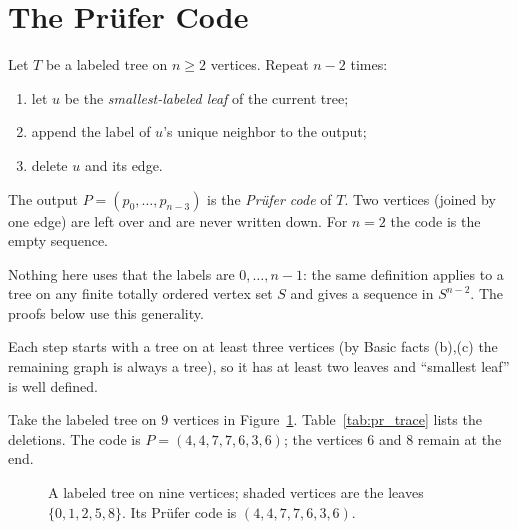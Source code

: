 \documentclass[11pt]{article}
\begin{document}
\section{The Prüfer Code}
\begin{definitionbox}
Let $T$ be a labeled tree on $n\ge 2$ vertices. Repeat $n-2$ times:
\begin{enumerate}[leftmargin=1.5em,itemsep=1pt]
  \item let $u$ be the \emph{smallest-labeled leaf} of the current tree;
  \item append the label of $u$'s unique neighbor to the output;
  \item delete $u$ and its edge.
\end{enumerate}
The output $P=(p_0,\dots,p_{n-3})$ is the \emph{Prüfer code} of $T$.
Two vertices (joined by one edge) are left over and are never written
down. For $n=2$ the code is the empty sequence.

Nothing here uses that the labels are $0,\dots,n-1$: the same definition
applies to a tree on any finite totally ordered vertex set $S$ and gives a
sequence in $S^{n-2}$. The proofs below use this generality.
\end{definitionbox}
Each step starts with a tree on at least three vertices (by
Basic facts (b),(c) the remaining graph is always a tree), so it has at
least two leaves and ``smallest leaf'' is well defined.

\begin{examplebox}
Take the labeled tree on $9$ vertices in Figure~\ref{fig:pr_tree}.
Table~\ref{tab:pr_trace} lists the deletions. The code is
$P=(4,4,7,7,6,3,6)$; the vertices $6$ and $8$ remain at the end.
\end{examplebox}

\begin{figure}[H]
\centering
{}
\caption{A labeled tree on nine vertices; shaded vertices are the leaves
$\{0,1,2,5,8\}$. Its Prüfer code is $(4,4,7,7,6,3,6)$.}\label{fig:pr_tree}
\end{figure}
\end{document}
